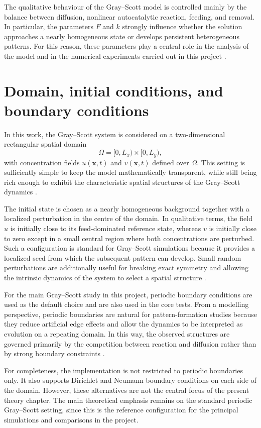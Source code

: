 The qualitative behaviour of the Gray--Scott model is controlled mainly by the balance between diffusion, nonlinear autocatalytic reaction, feeding, and removal. In particular, the parameters $F$ and $k$ strongly influence whether the solution approaches a nearly homogeneous state or develops persistent heterogeneous patterns. For this reason, these parameters play a central role in the analysis of the model and in the numerical experiments carried out in this project \citep{gandy2022,pearson1993}.

\section{Domain, initial conditions, and boundary conditions}

In this work, the Gray--Scott system is considered on a two-dimensional rectangular spatial domain
\[
\Omega = [0,L_x) \times [0,L_y),
\]
with concentration fields $u(\mathbf{x},t)$ and $v(\mathbf{x},t)$ defined over $\Omega$. This setting is sufficiently simple to keep the model mathematically transparent, while still being rich enough to exhibit the characteristic spatial structures of the Gray--Scott dynamics \citep{gandy2022,pearson1993}.

The initial state is chosen as a nearly homogeneous background together with a localized perturbation in the centre of the domain. In qualitative terms, the field $u$ is initially close to its feed-dominated reference state, whereas $v$ is initially close to zero except in a small central region where both concentrations are perturbed. Such a configuration is standard for Gray--Scott simulations because it provides a localized seed from which the subsequent pattern can develop. Small random perturbations are additionally useful for breaking exact symmetry and allowing the intrinsic dynamics of the system to select a spatial structure \citep{pearson1993,gandy2022}.

For the main Gray--Scott study in this project, periodic boundary conditions are used as the default choice and are also used in the core tests. From a modelling perspective, periodic boundaries are natural for pattern-formation studies because they reduce artificial edge effects and allow the dynamics to be interpreted as evolution on a repeating domain. In this way, the observed structures are governed primarily by the competition between reaction and diffusion rather than by strong boundary constraints \citep{pearson1993,gandy2022}.

For completeness, the implementation is not restricted to periodic boundaries only. It also supports Dirichlet and Neumann boundary conditions on each side of the domain. However, these alternatives are not the central focus of the present theory chapter. The main theoretical emphasis remains on the standard periodic Gray--Scott setting, since this is the reference configuration for the principal simulations and comparisons in the project.

